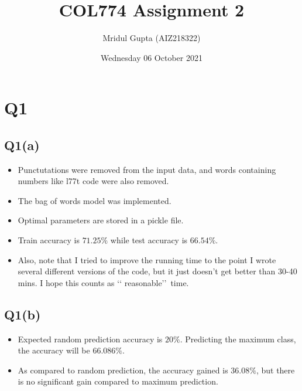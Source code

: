 \documentclass[11pt]{article}
\author{Mridul Gupta (AIZ218322)}
\date{Wednesday 06 October 2021}
\title{COL774 Assignment 2}
\begin{document}
\maketitle

\section{Q1}
\label{sec:org63bf15d}

\subsection{Q1(a)}
\label{sec:orgfd06dca}
\begin{itemize}
\item Punctutations were removed from the input data, and words containing
numbers like l77t code were also removed.
\item The bag of words model was implemented.
\item Optimal parameters are stored in a pickle file.
\item Train accuracy is \(71.25\%\) while test accuracy is \(66.54\%\).
\item Also, note that I tried to improve the running time to the point I
wrote several different versions of the code, but it just doesn't
get better than 30-40 mins. I hope this counts as \lq\lq
reasonable\rq\rq\ time.
\end{itemize}

\subsection{Q1(b)}
\label{sec:orgeee4adf}
\begin{itemize}
\item Expected random prediction accuracy is \(20\%\). Predicting the
maximum class, the accuracy will be \(66.086\%\).
\item As compared to random prediction, the accuracy gained is \(36.08\%\),
but there is no significant gain compared to maximum prediction.
\end{itemize}
\end{document}
